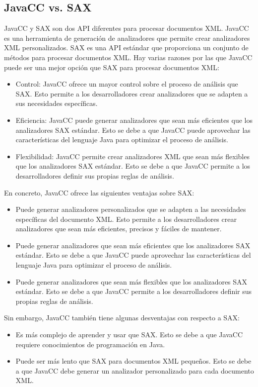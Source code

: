 \subsection{JavaCC vs. SAX}

\noindent JavaCC y SAX son dos API diferentes para procesar documentos XML. JavaCC es una herramienta de generación de analizadores que permite crear analizadores XML personalizados. SAX es una API estándar que proporciona un conjunto de métodos para procesar documentos XML.
Hay varias razones por las que JavaCC puede ser una mejor opción que SAX para procesar documentos XML:
\begin{itemize}
    \item Control: JavaCC ofrece un mayor control sobre el proceso de análisis que SAX. Esto permite a los desarrolladores crear analizadores que se adapten a sus necesidades específicas.
    \item Eficiencia: JavaCC puede generar analizadores que sean más eficientes que los analizadores SAX estándar. Esto se debe a que JavaCC puede aprovechar las características del lenguaje Java para optimizar el proceso de análisis.
    \item Flexibilidad: JavaCC permite crear analizadores XML que sean más flexibles que los analizadores SAX estándar. Esto se debe a que JavaCC permite a los desarrolladores definir sus propias reglas de análisis.
\end{itemize}
En concreto, JavaCC ofrece las siguientes ventajas sobre SAX:
\begin{itemize}
    \item Puede generar analizadores personalizados que se adapten a las necesidades específicas del documento XML. Esto permite a los desarrolladores crear analizadores que sean más eficientes, precisos y fáciles de mantener.
    \item Puede generar analizadores que sean más eficientes que los analizadores SAX estándar. Esto se debe a que JavaCC puede aprovechar las características del lenguaje Java para optimizar el proceso de análisis.
    \item Puede generar analizadores que sean más flexibles que los analizadores SAX estándar. Esto se debe a que JavaCC permite a los desarrolladores definir sus propias reglas de análisis.
\end{itemize}

Sin embargo, JavaCC también tiene algunas desventajas con respecto a SAX:
\begin{itemize}
    \item Es más complejo de aprender y usar que SAX. Esto se debe a que JavaCC requiere conocimientos de programación en Java.
    \item Puede ser más lento que SAX para documentos XML pequeños. Esto se debe a que JavaCC debe generar un analizador personalizado para cada documento XML.
\end{itemize}

